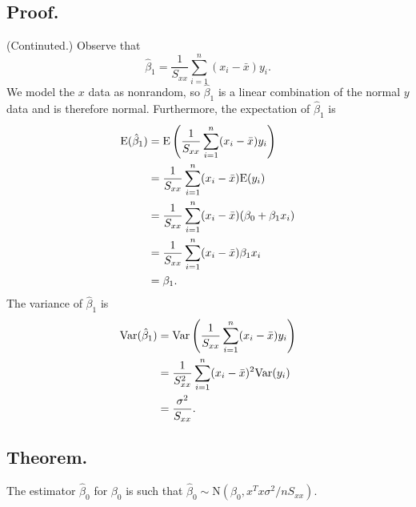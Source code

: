 \documentclass[titlepage]{article}
\begin{document}
\subsection{Proof.} (Continuted.) Observe that 
$$\hat{\beta}_{1} = \frac{1}{S_{xx}}\sum_{i=1}^{n}(x_{i} - \bar{x})y_{i}.$$
We model the $x$ data as nonrandom, so $\hat{\beta}_{1}$ is a linear combination of the normal $y$ data and is therefore normal. Furthermore, the expectation of $\hat{\beta}_{1}$ is
\begin{align*}
    \text{E}(\hat{\beta}_{1}) &= \text{E}\left(\frac{1}{S_{xx}}\sum_{i=1}^{n}(x_{i}-\bar{x})y_{i}\right) \\
                        &= \frac{1}{S_{xx}}\sum_{i=1}^{n}(x_{i}-\bar{x})\text{E}(y_{i}) \\
                        &= \frac{1}{S_{xx}}\sum_{i=1}^{n}(x_{i}-\bar{x})(\beta_{0} + \beta_{1}x_{i}) \\
                        &= \frac{1}{S_{xx}}\sum_{i=1}^{n}(x_{i}-\bar{x})\beta_{1}x_{i} \\
                        &= \beta_{1}.
\end{align*}
The variance of $\hat{\beta}_{1}$ is
\begin{align*}
    \text{Var}(\hat{\beta}_{1}) &= \text{Var}\left(\frac{1}{S_{xx}}\sum_{i=1}^{n}(x_{i}-\bar{x})y_{i}\right) \\
                          &= \frac{1}{S_{xx}^{2}}\sum_{i=1}^{n}(x_{i}-\bar{x})^{2}\text{Var}(y_{i}) \\
                          &= \frac{\sigma^{2}}{S_{xx}}.
\end{align*}

\subsection{Theorem.} The estimator $\hat{\beta}_{0}$ for $\beta_{0}$ is such that $\hat{\beta}_{0} \sim \text{N}(\beta_{0}, x^{T}x\sigma^{2}/nS_{xx})$.
\end{document}
